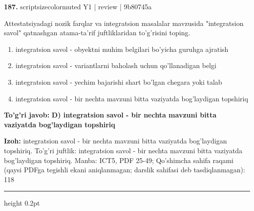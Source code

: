 \documentclass[10pt,a4paper]{article}
\begin{document}
{\bfseries\sffamily\color{ink} 187.} {scriptsizecolor{muted} Y1 | review | 9b80745a}
\par
Attestatsiyadagi nozik farqlar va integratsion masalalar mavzusida "integratsion savol" qatnashgan atama-ta'rif juftliklaridan to'g'risini toping.
\begin{enumerate}[label=\Alph*),leftmargin=9mm]
\item integratsion savol - obyektni muhim belgilari bo'yicha guruhga ajratish
\item integratsion savol - variantlarni baholash uchun qo'llanadigan belgi
\item integratsion savol - yechim bajarishi shart bo'lgan chegara yoki talab
\item integratsion savol - bir nechta mavzuni bitta vaziyatda bog'laydigan topshiriq
\end{enumerate}
\begin{tcolorbox}[enhanced,breakable,colback=teal!4,colframe=teal!60!black,boxrule=0.45pt,arc=1.2mm,left=2.7mm,right=2.7mm,top=1.8mm,bottom=1.8mm,before skip=2mm,after skip=2mm]
{\bfseries\sffamily\color{teal}To'g'ri javob:} \textbf{D) integratsion savol - bir nechta mavzuni bitta vaziyatda bog'laydigan topshiriq}
\par\smallskip
{\bfseries Izoh:} integratsion savol - bir nechta mavzuni bitta vaziyatda bog'laydigan topshiriq. To'g'ri juftlik: integratsion savol - bir nechta mavzuni bitta vaziyatda bog'laydigan topshiriq. Manba: ICT5, PDF 25-49; Qo'shimcha sahifa raqami (qaysi PDFga tegishli ekani aniqlanmagan; darslik sahifasi deb tasdiqlanmagan): 118
\end{tcolorbox}
\vspace{2mm}\hrule height 0.2pt\vspace{3mm}
\end{document}
